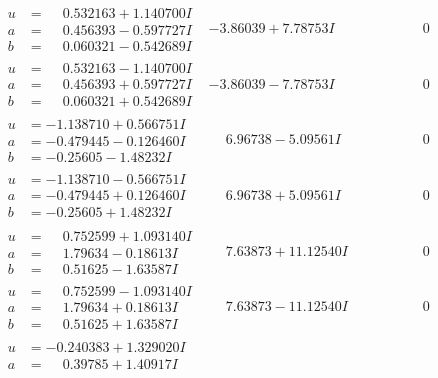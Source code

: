 \documentclass[1p]{elsarticle_modified}
\theoremstyle{definition}
\begin{document}
$$\begin{array}{c|c|c}
 \hline 
\begin{aligned}
u &= \phantom{-}0.532163 + 1.140700 I \\
a &= \phantom{-}0.456393 - 0.597727 I \\
b &= \phantom{-}0.060321 - 0.542689 I\end{aligned}
 & -3.86039 + 7.78753 I & \phantom{-0.000000 } 0 \\ \hline\begin{aligned}
u &= \phantom{-}0.532163 - 1.140700 I \\
a &= \phantom{-}0.456393 + 0.597727 I \\
b &= \phantom{-}0.060321 + 0.542689 I\end{aligned}
 & -3.86039 - 7.78753 I & \phantom{-0.000000 } 0 \\ \hline\begin{aligned}
u &= -1.138710 + 0.566751 I \\
a &= -0.479445 - 0.126460 I \\
b &= -0.25605 - 1.48232 I\end{aligned}
 & \phantom{-}6.96738 - 5.09561 I & \phantom{-0.000000 } 0 \\ \hline\begin{aligned}
u &= -1.138710 - 0.566751 I \\
a &= -0.479445 + 0.126460 I \\
b &= -0.25605 + 1.48232 I\end{aligned}
 & \phantom{-}6.96738 + 5.09561 I & \phantom{-0.000000 } 0 \\ \hline\begin{aligned}
u &= \phantom{-}0.752599 + 1.093140 I \\
a &= \phantom{-}1.79634 - 0.18613 I \\
b &= \phantom{-}0.51625 - 1.63587 I\end{aligned}
 & \phantom{-}7.63873 + 11.12540 I & \phantom{-0.000000 } 0 \\ \hline\begin{aligned}
u &= \phantom{-}0.752599 - 1.093140 I \\
a &= \phantom{-}1.79634 + 0.18613 I \\
b &= \phantom{-}0.51625 + 1.63587 I\end{aligned}
 & \phantom{-}7.63873 - 11.12540 I & \phantom{-0.000000 } 0 \\ \hline\begin{aligned}
u &= -0.240383 + 1.329020 I \\
a &= \phantom{-}0.39785 + 1.40917 I \\

\end{aligned}
\end{array}$$
\end{document}
